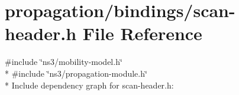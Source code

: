\hypertarget{propagation_2bindings_2scan-header_8h}{}\section{propagation/bindings/scan-\/header.h File Reference}
\label{propagation_2bindings_2scan-header_8h}
{\ttfamily \#include \char`\"{}ns3/mobility-\/model.\+h\char`\"{}}\\*
{\ttfamily \#include \char`\"{}ns3/propagation-\/module.\+h\char`\"{}}\\*
Include dependency graph for scan-\/header.h\+:
